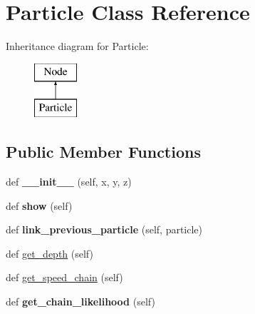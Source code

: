 \hypertarget{class_emulator_1_1_particle}{}\section{Particle Class Reference}
\label{class_emulator_1_1_particle}
Inheritance diagram for Particle\+:\begin{figure}[H]
\begin{center}
\leavevmode
\includegraphics[height=2.000000cm]{class_emulator_1_1_particle}
\end{center}
\end{figure}
\subsection*{Public Member Functions}
\begin{DoxyCompactItemize}
\item 
\mbox{\label{class_emulator_1_1_particle_ae6bf6b467ea8b8177ab9fa937a90721c}} 
def {\bfseries \+\_\+\+\_\+init\+\_\+\+\_\+} (self, x, y, z)
\item 
\mbox{\label{class_emulator_1_1_particle_ab4f4398c3f210fe4ea6e720401357691}} 
def {\bfseries show} (self)
\item 
\mbox{\label{class_emulator_1_1_particle_ab7a916c513a14fe1dd5ca49be9a9e3a0}} 
def {\bfseries link\+\_\+previous\+\_\+particle} (self, particle)
\item 
def \mbox{\hyperlink{class_emulator_1_1_particle_a0a2e587249786c6cd49c4c72792667f5}{get\+\_\+depth}} (self)
\item 
def \mbox{\hyperlink{class_emulator_1_1_particle_af84bb961f8e262b28fe9ae6eb4d61e5f}{get\+\_\+speed\+\_\+chain}} (self)
\item 
\mbox{\label{class_emulator_1_1_particle_af5b3fcca9b837f7e61d45a1d267d5add}} 
def {\bfseries get\+\_\+chain\+\_\+likelihood} (self)
\end{DoxyCompactItemize}
